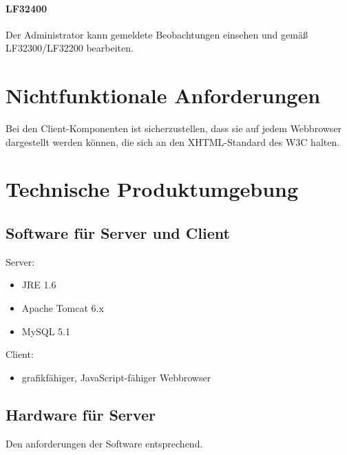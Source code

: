 \documentclass[a4paper,11pt]{article}             %
\begin{document}
			\paragraph{LF32400}
				Der Administrator kann gemeldete Beobachtungen einsehen und gemäß LF32300/LF32200 bearbeiten.





\section{Nichtfunktionale Anforderungen}
	Bei den Client-Komponenten ist sicherzustellen, dass sie auf jedem Webbrowser dargestellt werden können, die sich an den XHTML-Standard des W3C halten.
\section{Technische Produktumgebung}
	\subsection{Software für Server und Client}
		Server:
		\begin{itemize}
			\item JRE 1.6
			\item Apache Tomcat 6.x 
			\item MySQL 5.1
		\end{itemize}
		Client:
		\begin{itemize}
			\item grafikfähiger, JavaScript-fähiger Webbrowser
		\end{itemize}
	\subsection{Hardware für Server}
		Den anforderungen der Software entsprechend.
\end{document}
